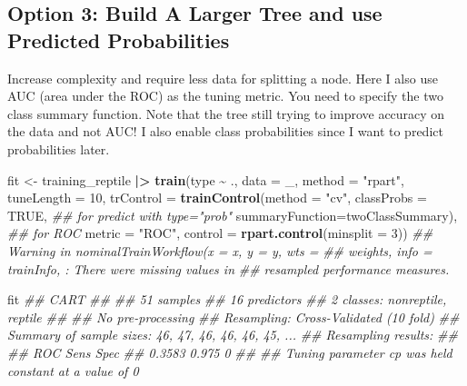 \documentclass[
  notitlepage]{book}
\newenvironment{Shaded}{\begin{snugshade}}{\end{snugshade}}
\newcommand{\CommentTok}[1]{\textcolor[rgb]{0.56,0.35,0.01}{\textit{#1}}}
\newcommand{\DataTypeTok}[1]{\textcolor[rgb]{0.13,0.29,0.53}{#1}}
\newcommand{\DecValTok}[1]{\textcolor[rgb]{0.00,0.00,0.81}{#1}}
\newcommand{\ErrorTok}[1]{\textcolor[rgb]{0.64,0.00,0.00}{\textbf{#1}}}
\newcommand{\KeywordTok}[1]{\textcolor[rgb]{0.13,0.29,0.53}{\textbf{#1}}}
\newcommand{\NormalTok}[1]{#1}
\newcommand{\OperatorTok}[1]{\textcolor[rgb]{0.81,0.36,0.00}{\textbf{#1}}}
\newcommand{\OtherTok}[1]{\textcolor[rgb]{0.56,0.35,0.01}{#1}}
\newcommand{\StringTok}[1]{\textcolor[rgb]{0.31,0.60,0.02}{#1}}
\begin{document}
\hypertarget{option-3-build-a-larger-tree-and-use-predicted-probabilities}{%
\subsection{Option 3: Build A Larger Tree and use Predicted Probabilities}\label{option-3-build-a-larger-tree-and-use-predicted-probabilities}}

Increase complexity and require less data for splitting a node. Here I
also use AUC (area under the ROC) as the tuning metric. You need to
specify the two class summary function. Note that the tree still trying
to improve accuracy on the data and not AUC! I also enable class
probabilities since I want to predict probabilities later.

\begin{Shaded}
\begin{Highlighting}[]
\NormalTok{fit \textless{}{-}}\StringTok{ }\NormalTok{training\_reptile }\OperatorTok{|}\ErrorTok{\textgreater{}}\StringTok{ }
\StringTok{  }\KeywordTok{train}\NormalTok{(type }\OperatorTok{\textasciitilde{}}\StringTok{ }\NormalTok{.,}
        \DataTypeTok{data =}\NormalTok{ \_,}
        \DataTypeTok{method =} \StringTok{"rpart"}\NormalTok{,}
        \DataTypeTok{tuneLength =} \DecValTok{10}\NormalTok{,}
        \DataTypeTok{trControl =} \KeywordTok{trainControl}\NormalTok{(}\DataTypeTok{method =} \StringTok{"cv"}\NormalTok{,}
        \DataTypeTok{classProbs =} \OtherTok{TRUE}\NormalTok{,  }\CommentTok{\#\# for predict with type="prob"}
        \DataTypeTok{summaryFunction=}\NormalTok{twoClassSummary),  }\CommentTok{\#\# for ROC}
        \DataTypeTok{metric =} \StringTok{"ROC"}\NormalTok{,}
        \DataTypeTok{control =} \KeywordTok{rpart.control}\NormalTok{(}\DataTypeTok{minsplit =} \DecValTok{3}\NormalTok{))}
\CommentTok{\#\# Warning in nominalTrainWorkflow(x = x, y = y, wts =}
\CommentTok{\#\# weights, info = trainInfo, : There were missing values in}
\CommentTok{\#\# resampled performance measures.}
\end{Highlighting}
\end{Shaded}

\begin{Shaded}
\begin{Highlighting}[]
\NormalTok{fit}
\CommentTok{\#\# CART }
\CommentTok{\#\# }
\CommentTok{\#\# 51 samples}
\CommentTok{\#\# 16 predictors}
\CommentTok{\#\#  2 classes: \textquotesingle{}nonreptile\textquotesingle{}, \textquotesingle{}reptile\textquotesingle{} }
\CommentTok{\#\# }
\CommentTok{\#\# No pre{-}processing}
\CommentTok{\#\# Resampling: Cross{-}Validated (10 fold) }
\CommentTok{\#\# Summary of sample sizes: 46, 47, 46, 46, 46, 45, ... }
\CommentTok{\#\# Resampling results:}
\CommentTok{\#\# }
\CommentTok{\#\#   ROC     Sens   Spec}
\CommentTok{\#\#   0.3583  0.975  0   }
\CommentTok{\#\# }
\CommentTok{\#\# Tuning parameter \textquotesingle{}cp\textquotesingle{} was held constant at a value of 0}
\end{Highlighting}
\end{Shaded}
\end{document}
